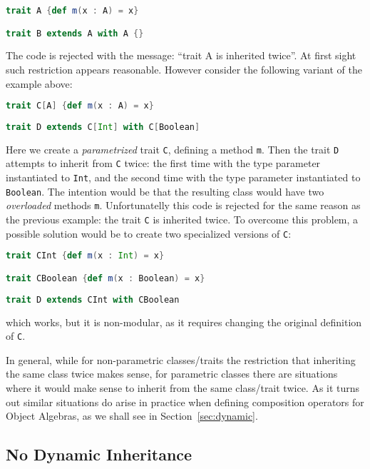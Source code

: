 \begin{lstlisting}[language=scala]
trait A {def m(x : A) = x}

trait B extends A with A {}
\end{lstlisting}

\noindent The code is rejected with the message: ``trait A is
inherited twice''. At first sight such restriction appears
reasonable. However consider the following variant of the example 
above:

\begin{lstlisting}[language=scala]
trait C[A] {def m(x : A) = x}
	
trait D extends C[Int] with C[Boolean]
\end{lstlisting}

\noindent Here we create a \emph{parametrized} trait \lstinline{C}, 
defining a method \lstinline{m}. Then the trait \lstinline{D} attempts 
to inherit from \lstinline{C} twice: the first time with the type
parameter instantiated to \lstinline{Int}, and the second time with
the type parameter instantiated to \lstinline{Boolean}. The intention 
would be that the resulting class would have two \emph{overloaded}
methods \lstinline{m}. Unfortunatelly this code is rejected for the
same reason as the previous example: the trait \lstinline{C} is
inherited twice. To overcome this problem, a possible solution would
be to create two specialized versions of \lstinline{C}:

\begin{lstlisting}[language=scala]
trait CInt {def m(x : Int) = x}

trait CBoolean {def m(x : Boolean) = x}
	
trait D extends CInt with CBoolean
\end{lstlisting}

\noindent which works, but it is non-modular, as it requires changing 
the original definition of \lstinline{C}. 

In general, while for non-parametric classes/traits the restriction
that inheriting the same class twice makes sense, for parametric
classes there are situations where it would make sense to inherit 
from the same class/trait twice. As it turns out similar situations 
do arise in practice when defining composition operators for
Object Algebras, as we shall see in Section~\ref{sec:dynamic}.

\subsection{No Dynamic Inheritance}

